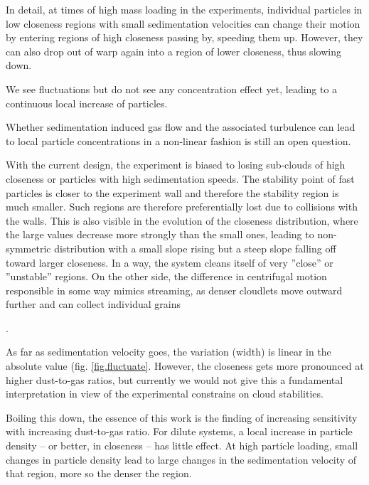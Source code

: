 In detail, at times of high mass loading in the experiments, individual particles in low closeness regions with small sedimentation velocities 
can change their motion by entering regions of high closeness passing by, speeding them up. 
However, they can also drop out of warp again into a region of lower closeness, thus slowing down. 

We see fluctuations but do not see any concentration effect yet, leading to a continuous local increase of particles. 
{Whether sedimentation induced gas flow and the associated turbulence can lead to local particle concentrations in a non-linear fashion is still an open question.

With the current design,
the experiment is biased to losing sub-clouds of high closeness or particles with high sedimentation speeds.  The stability point of fast particles is closer to the experiment wall and therefore the stability region is much smaller. Such regions are therefore preferentially lost due to collisions with the walls. This is also visible in the evolution of the closeness distribution, where the large values decrease more strongly than the small ones, leading to non-symmetric distribution with a small slope rising but a steep slope falling off toward larger closeness. In a way, the system cleans itself of 
very ''close'' or ''unstable'' regions. On the other side, the difference in centrifugal motion responsible in some way mimics streaming, as denser cloudlets move outward further and can collect individual grains}.


As far as sedimentation velocity goes, the variation (width) is linear in the absolute value (fig. \ref{fig.fluctuate}. 
However, the closeness gets more pronounced at higher dust-to-gas ratios, but currently we would not give this a fundamental interpretation in view of the experimental constrains on cloud stabilities.

Boiling this down, the essence of this work is the finding of increasing sensitivity
with increasing dust-to-gas ratio. For dilute systems, a local increase in particle density -- or better, in closeness -- has little effect. At high particle loading, small
changes in particle density lead to large changes in the sedimentation velocity of that region, more so the denser the region.

